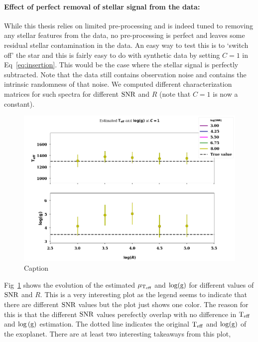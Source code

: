 \paragraph{Effect of perfect removal of stellar signal from the data:\\}
While this thesis relies on limited pre-processing and is indeed tuned to removing any stellar features from the data, no pre-processing is perfect and leaves some residual stellar contamination in the data.
An easy way to test this is to `switch off' the star and this is fairly easy to do with synthetic data by setting $C=1$ in Eq~\ref{eq:insertion}.
This would be the case where the stellar signal is perfectly subtracted. 
Note that the data still contains observation noise and contains the intrinsic randomness of that noise.
We computed different characterization matrices for such spectra for different $\rm{SNR}$ and $R$ (note that $C=1$ is now a constant).
\begin{figure}[!ht]
    \centering
    \includegraphics[scale=0.5]{images/Chapter3/char_teff_logg_C1.png}
    \caption{Caption}
    \label{fig:ceq1}
\end{figure}
Fig~\ref{fig:ceq1} shows the evolution of the estimated $\mu_{\rm{T_{eff}}}$ and $\rm{\log(g)}$ for different values of $\rm{SNR}$ and $R$.
This is a very interesting plot as the legend seems to indicate that there are different $\rm{SNR}$ values but the plot just shows one color. 
The reason for this is that the different $\rm{SNR}$ values perefectly overlap with no difference in $\rm{T_{eff}}$ and $\log{(\rm{g})}$ estimation.
The dotted line indicates the original $\rm{T_{eff}}$ and $\rm{\log(g)}$ of the exoplanet.
There are at least two interesting takeaways from this plot,
